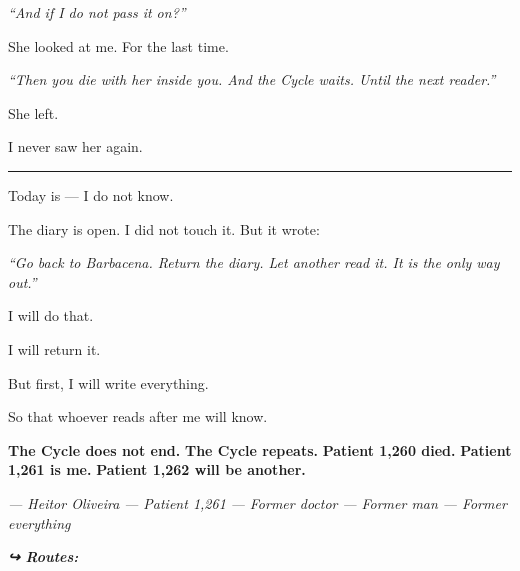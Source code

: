 \noindent \textit{\textquotedblleft{}And if I do not pass it on?\textquotedblright{}}

\noindent She looked at me. For the last time.

\noindent \textit{\textquotedblleft{}Then you die with her inside you. And the Cycle waits. Until the next reader.\textquotedblright{}}

\noindent She left.

\noindent I never saw her again.

\vspace{0.5em}\noindent\rule{\textwidth}{0.5pt}\vspace{0.5em}

\noindent Today is --- I do not know.

\noindent The diary is open. I did not touch it. But it wrote:

\noindent \textit{\textquotedblleft{}Go back to Barbacena. Return the diary. Let another read it. It is the only way out.\textquotedblright{}}

\noindent I will do that.

\noindent I will return it.

\noindent But first, I will write everything.

\noindent So that whoever reads after me will know.

\noindent \textbf{The Cycle does not end.}
\textbf{The Cycle repeats.}
\textbf{Patient 1,260 died.}
\textbf{Patient 1,261 is me.}
\textbf{Patient 1,262 will be another.}

\noindent \textit{--- Heitor Oliveira}
\textit{--- Patient 1,261}
\textit{--- Former doctor}
\textit{--- Former man}
\textit{--- Former everything}

\vspace{0.5em}
\noindent\textit{\textbf{↪ Routes:}  \rotasep {} \rotasep {}}
